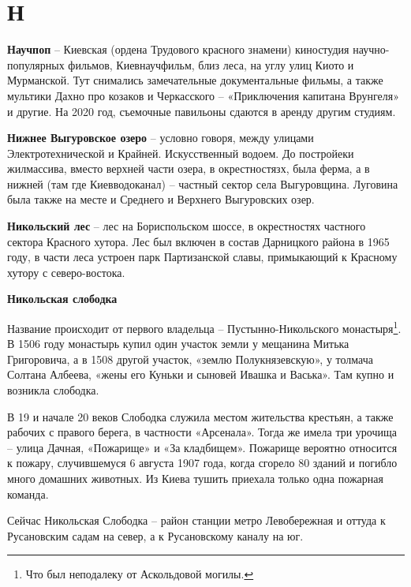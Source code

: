 \chapter*{Н}

\textbf{Научпоп} – Киевская (ордена Трудового красного знамени) киностудия научно-популярных фильмов, Киевнаучфильм, близ леса, на углу улиц Киото и Мурманской. Тут снимались замечательные документальные фильмы, а также мультики Дахно про козаков и Черкасского – «Приключения капитана Врунгеля» и другие. На 2020 год, съемочные павильоны сдаются в аренду другим студиям.\\


\medskip

\textbf{Нижнее Выгуровское озеро} – условно говоря, между улицами Электротехнической и Крайней. Искусственный водоем. До постройеки жилмассива, вместо верхней части озера, в окрестностязх, была ферма, а в нижней (там где Киевводоканал) – частный сектор села Выгуровщина. Луговина была также на месте и Среднего и Верхнего Выгуровских озер.\\

\medskip


\textbf{Никольский лес} – лес на Бориспольском шоссе, в окрестностях частного сектора Красного хутора. Лес был включен в состав Дарницкого района в 1965 году, в части леса устроен парк Партизанской славы, примыкающий к Красному хутору с северо-востока.\\

\medskip


\textbf{Никольская слободка}

Название происходит от первого владельца – Пустынно-Никольского монастыря\footnote{Что был неподалеку от Аскольдовой могилы.}. В 1506 году монастырь купил один участок земли у мещанина Митька Григоровича, а в 1508 другой участок, «землю Полукнязевскую», у толмача Солтана Албеева, «жены его Куньки и сыновей Ивашка и Васька». Там купно и возникла слободка.

 В 19 и начале 20 веков Слободка служила местом жительства крестьян, а также рабочих с правого берега, в частности «Арсенала». Тогда же имела три урочища – улица Дачная, «Пожарище» и «За кладбищем». Пожарище вероятно относится к пожару, случившемуся 6 августа 1907 года, когда сгорело 80 зданий и погибло много домашних животных. Из Киева тушить приехала только одна пожарная команда.

Сейчас Никольская Слободка – район станции метро Левобережная и оттуда к Русановским садам на север, а к Русановскому каналу на юг.

